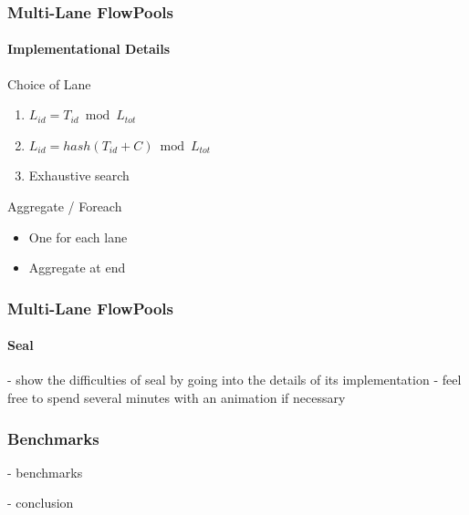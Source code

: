 \documentclass{beamer}
\begin{document}
\begin{frame}
  \frametitle{Multi-Lane FlowPools}
  \framesubtitle{Implementational Details}

  \begin{block}{Choice of Lane}
    \begin{enumerate}
    \item $L_{id} = T_{id} \bmod L_{tot}$
    \item $L_{id} = hash(T_{id} + C) \bmod L_{tot}$
    \item Exhaustive search
    \end{enumerate}
  \end{block}

  \begin{block}{Aggregate / Foreach}
    \begin{itemize}
    \item One for each lane
    \item Aggregate at end
    \end{itemize}
  \end{block}

\end{frame}

\begin{frame}
  \frametitle{Multi-Lane FlowPools}
  \framesubtitle{Seal}

- show the difficulties of seal by going into the details of its implementation - feel free to spend several minutes with an animation if necessary

\end{frame}

\begin{frame}
  \frametitle{Benchmarks}

- benchmarks
\end{frame}

\begin{frame}
- conclusion
\end{frame}
\end{document}
